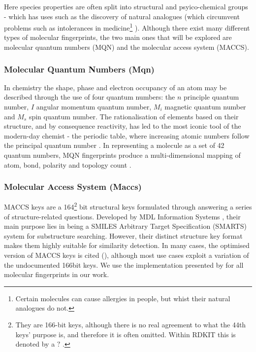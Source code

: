 Here species properties are often split into structural and psyico-chemical groups - which has uses such as the discovery of natural analogues (which circumvent problems such as intolerances in medicine\footnote{Certain molecules can cause allergies in people, but whist their natural analogues do not. } \citep{analog}). Although there exist many different types of molecular fingerprints, the two main ones that will be explored are molecular quantum numbers (MQN) and the molecular access system (MACCS).

\subsubsection{Molecular Quantum Numbers (Mqn)}
In chemistry the shape, phase and electron occupancy of an atom may be described through the use of four quantum numbers: the $n$ principle quantum number, $I$ angular momentum quantum number, $M_i$ magnetic quantum number and $M_s$ spin quantum number. The rationalisation of elements based on their structure, and by consequence reactivity, has led to the most iconic tool of the modern-day chemist - the periodic table, where increasing atomic numbers follow the principal quantum number \citep{periodic}. In representing a molecule as a set of 42 quantum numbers, MQN fingerprints produce a multi-dimensional mapping of atom, bond, polarity and topology count \citep{MQN}.


\subsubsection{Molecular Access System (Maccs)}
MACCS keys are a 164\footnote{They are 166-bit keys, although there is no real agreement to what the 44th keys' purpose is, and therefore it is often omitted. Within RDKIT this is denoted by a $?$ \citep{rdkitcode}.} bit structural keys formulated through answering a series of structure-related questions. Developed by MDL Information Systems \citep{maccs}, their main purpose lies in being a SMILES Arbitrary Target Specification (SMARTS) system for substructure searching. However, their distinct structure key format makes them highly suitable for similarity detection. In many cases, the optimised version of MACCS keys is cited (\citep{optimised}), although most use cases exploit a variation of the undocumented 166bit keys. We use the implementation presented by \citep{rdkit,rdkitcode} for all molecular fingerprints in our work.


